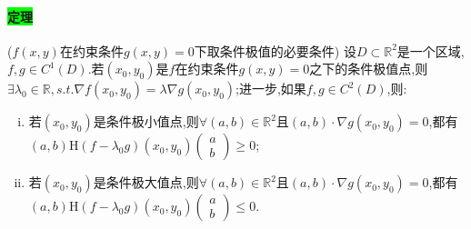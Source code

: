 \documentclass[UTF8]{ctexart}
\begin{document}
    \paragraph{\colorbox{lime}{定理}}($f(x,y)$在约束条件$g(x,y)=0$下取条件极值的必要条件) 设$D\subset\mathbb{R}^2$是一个区域,$f,g\in C^1(D)$.若$(x_0,y_0)$是$f$在约束条件$g(x,y)=0$之下的条件极值点,则$\exists\lambda_0\in\mathbb{R},s.t.\nabla f(x_0,y_0)=\lambda\nabla g(x_0,y_0)$;进一步,如果$f,g\in C^2(D)$,则:
    \begin{enumerate}[i)]
        \item 若$(x_0,y_0)$是条件极小值点,则$\forall(a,b)\in\mathbb{R}^2$且$(a,b)\cdot\nabla g(x_0,y_0)=0$,都有$(a,b)\mathrm{H}(f-\lambda_0g)(x_0,y_0)\begin{pmatrix}
            a\\
            b
        \end{pmatrix}\ge 0$;
        \item 若$(x_0,y_0)$是条件极大值点,则$\forall(a,b)\in\mathbb{R}^2$且$(a,b)\cdot\nabla g(x_0,y_0)=0$,都有$(a,b)\mathrm{H}(f-\lambda_0g)(x_0,y_0)\begin{pmatrix}
            a\\
            b
        \end{pmatrix}\le 0$.
    \end{enumerate}
\end{document}
